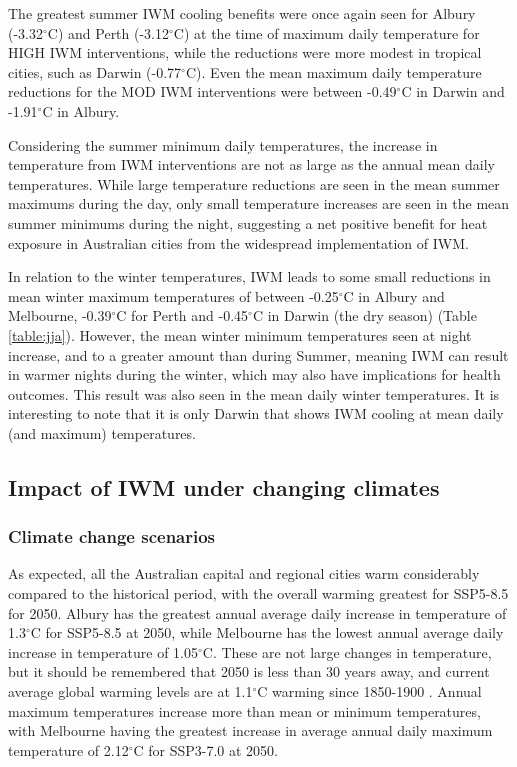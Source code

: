 \documentclass[utf8]{frontiersSCNS} %
\begin{document}
The greatest summer IWM cooling benefits were once again seen for Albury (-3.32$^{\circ}$C) and Perth (-3.12$^{\circ}$C) at the time of maximum daily temperature for HIGH IWM interventions, while the reductions were more modest in tropical cities, such as Darwin (-0.77$^{\circ}$C). Even the mean maximum daily temperature reductions for the MOD IWM interventions were between -0.49$^{\circ}$C in Darwin and -1.91$^{\circ}$C in Albury. 

Considering the summer minimum daily temperatures, the increase in temperature from IWM interventions are not as large as the annual mean daily temperatures. While large temperature reductions are seen in the mean summer maximums during the day, only small temperature increases are seen in the mean summer minimums during the night, suggesting a net positive benefit for heat exposure in Australian cities from the widespread implementation of IWM. 

In relation to the winter temperatures, IWM leads to some small reductions in mean winter maximum temperatures of between -0.25$^{\circ}$C in Albury and Melbourne, -0.39$^{\circ}$C for Perth and -0.45$^{\circ}$C in Darwin (the dry season) (Table \ref{table:jja}). However, the mean winter minimum temperatures seen at night increase, and to a greater amount than during Summer, meaning IWM can result in warmer nights during the winter, which may also have implications for health outcomes. This result was also seen in the mean daily winter temperatures. It is interesting to note that it is only Darwin that shows IWM cooling at mean daily (and maximum) temperatures.  

\subsection{Impact of IWM under changing climates }\label{sec:results3}

\subsubsection{Climate change scenarios}\label{sec:results3a}

As expected, all the Australian capital and regional cities warm considerably compared to the historical period, with the overall warming greatest for SSP5-8.5 for 2050. Albury has the greatest annual average daily increase in temperature of 1.3$^{\circ}$C for SSP5-8.5 at 2050, while Melbourne has the lowest annual average daily increase in temperature of 1.05$^{\circ}$C. These are not large changes in temperature, but it should be remembered that 2050 is less than 30 years away, and current average global warming levels are at 1.1$^{\circ}$C warming since 1850-1900 \citep{IPCC2021}. Annual maximum temperatures increase more than mean or minimum temperatures, with Melbourne having the greatest increase in average annual daily maximum temperature of 2.12$^{\circ}$C for SSP3-7.0 at 2050.
\end{document}
